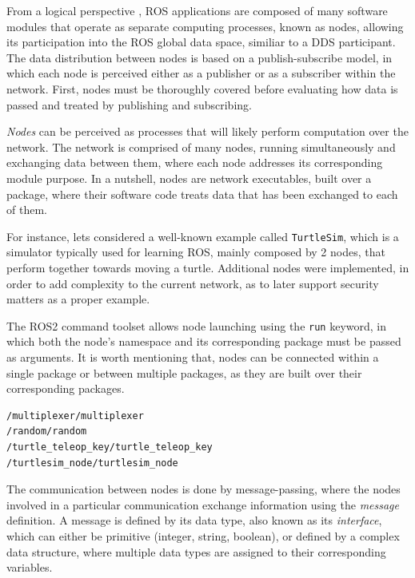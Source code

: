 From a logical perspective \cite{casini2019response}, ROS applications are composed of many software modules that operate as separate computing processes, known as nodes, allowing its participation into the ROS global data space, similiar to a DDS participant. The data distribution between nodes is based on a publish-subscribe model, in which each node is perceived either as a publisher or as a subscriber within the network. First, nodes must be thoroughly covered before evaluating how data is passed and treated by publishing and subscribing.
            
\textit{Nodes} can be perceived as processes that will likely perform computation over the network. The network is comprised of many nodes, running simultaneously and exchanging data between them, where each node addresses its corresponding module purpose. In a nutshell, nodes are network executables, built over a package, where their software code treats data that has been exchanged to each of them. %
       
For instance, lets considered a well-known example called \texttt{TurtleSim}, which is a simulator typically used for learning ROS, mainly composed by 2 nodes, that perform together towards moving a turtle. Additional nodes were implemented, in order to add complexity to the current network, as to later support security matters as a proper example. 

The ROS2 command toolset allows node launching using the \texttt{run} keyword, in which both the node's namespace and its corresponding package must be passed as arguments. It is worth mentioning that, nodes can be connected within a single package or between multiple packages, as they are built over their corresponding packages.

\begin{lstlisting}[title={The \texttt{TurtleSim} node list.}]
/multiplexer/multiplexer
/random/random
/turtle_teleop_key/turtle_teleop_key
/turtlesim_node/turtlesim_node
\end{lstlisting}

The communication between nodes is done by message-passing, where the nodes involved in a particular communication exchange information using the \textit{message} definition. A message is defined by its data type, also known as its \textit{interface}, which can either be primitive (integer, string, boolean), or defined by a complex data structure, where multiple data types are assigned to their corresponding variables. 

